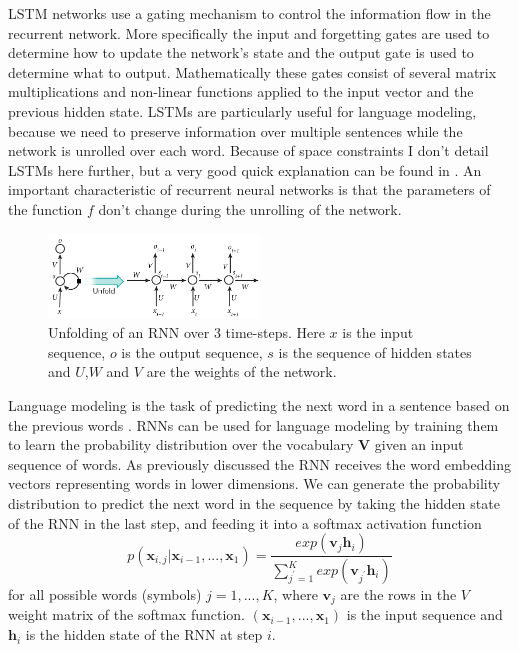 \documentclass[12pt]{article}
\begin{document}
LSTM networks use a gating mechanism to control the information flow in the recurrent network. More specifically the input and forgetting gates are used to determine how to update the network's state and the output gate is used to determine what to output. Mathematically these gates consist of several matrix multiplications and non-linear functions applied to the input vector and the previous hidden state. LSTMs are particularly useful for language modeling, because we need to preserve information over multiple sentences while the network is unrolled over each word. Because of space constraints I don't detail LSTMs here further, but a very good quick explanation can be found in \cite{LSTM_article}. An important characteristic of recurrent neural networks is that the parameters of the function \(f\) don't change during the unrolling of the network.

\begin{figure}[H]
	\label{fig:231}
	\centering
	\includegraphics[width=0.5\textwidth]{pics/rnn.jpg}
	\caption{Unfolding of an RNN over 3 time-steps. Here \(x\) is the input sequence, \(o\) is the output sequence, \(s\) is the sequence of hidden states and \(U\),\(W\) and \(V\) are the weights of the network. \cite{RNN_pic:2017}}
\end{figure}

Language modeling is the task of predicting the next word in a sentence based on the previous words \cite{Bengio:2003}. RNNs can be used for language modeling by training them to learn the probability distribution over the vocabulary \(\bm{V}\) given an input sequence of words. As previously discussed the RNN receives the word embedding vectors representing words in lower dimensions. We can generate the probability distribution to predict the next word in the sequence by taking the hidden state of the RNN in the last step, and feeding it into a softmax activation function
\begin{equation} \label{eq231b}
p(\bm{x}_{i,j}|\bm{x}_{i-1},...,\bm{x}_1)=\frac{exp(\bm{v}_j\bm{h}_i)}{\sum_{j^{'}=1}^{K}exp(\bm{v}_{j^{'}}\bm{h}_i)}
\end{equation}
for all possible words (symbols) \(j=1,...,K\), where \(\bm{v}_j\) are the rows in the \(V\) weight matrix of the softmax function. \((\bm{x}_{i-1},...,\bm{x}_1)\) is the input sequence and \(\bm{h}_i\) is the hidden state of the RNN at step \(i\).
\end{document}

